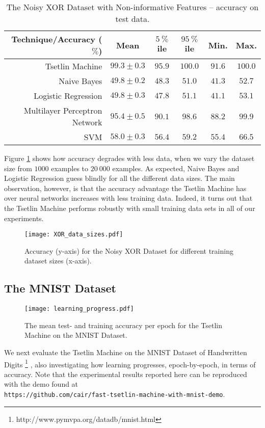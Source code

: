 \documentclass[11pt,a4paper]{article}
\begin{document}
\begin{table}[!bh]
    \centering
    \begin{tabular}{r||c|c|c|c|c}
         \bf Technique/Accuracy ($\%$)&\bf Mean&\bf $5~\%$ile &\bf $95~\%$ile&\bf Min.&\bf Max.\\
         \hline
    Tsetlin Machine&$99.3 \pm 0.3$&$95.9$&$100.0$&$91.6$&$100.0$\\
    Naive Bayes&$49.8 \pm 0.2$&$48.3$&$51.0$&$41.3$&$52.7$\\
    Logistic Regression&$49.8 \pm 0.3$&$47.8$&$51.1$&$41.1$&$53.1$\\
    Multilayer Perceptron Network&$95.4 \pm 0.5$&$90.1$&$98.6$&$88.2$&$99.9$\\
    SVM&$58.0 \pm 0.3$&$56.4$&$59.2$&$55.4$&$66.5$
    \end{tabular}
    \caption{The Noisy XOR Dataset with Non-informative Features -- accuracy on test data.}
    \label{tab:xor_test}
\end{table}

Figure \ref{figure:xor_data_sizes} shows how accuracy degrades with less data, when we vary the dataset size from $1000$ examples to $20~000$ examples. As expected, Naive Bayes and Logistic Regression guess blindly for all the different data sizes. The main observation, however, is that the accuracy advantage the Tsetlin Machine has over  neural networks increases with less training data. Indeed, it turns out that the Tsetlin Machine performs robustly with small training data sets in all of our experiments.

\begin{figure}[!ht]
\centering
\texttt{[image: XOR\_data\_sizes.pdf]}
\caption{Accuracy (y-axis) for the Noisy XOR Dataset for different training dataset sizes (x-axis).}
\label{figure:xor_data_sizes}
\end{figure}

\subsection{The MNIST Dataset}

\begin{figure}[!ht]
\centering
\texttt{[image: learning\_progress.pdf]}
\caption{The mean test- and training accuracy per epoch for the Tsetlin Machine on the MNIST Dataset.}
\label{figure:learning_progress}
\end{figure}

We next evaluate the Tsetlin Machine on the MNIST Dataset of Handwritten Digits \footnote{http://www.pymvpa.org/datadb/mnist.html} \cite{LeCun1998}, also investigating how learning progresses, epoch-by-epoch, in terms of accuracy. Note that the experimental results reported here can be reproduced with the demo found at\\ {\tt https://github.com/cair/fast-tsetlin-machine-with-mnist-demo}.
\end{document}

